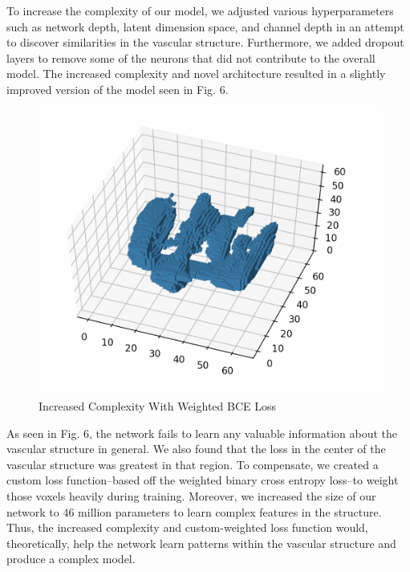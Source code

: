 \documentclass[conference, 10pt]{IEEEtran}
\begin{document}
To increase the complexity of our model, we adjusted various hyperparameters 
such as network depth, latent dimension space, and channel depth in an attempt
to discover similarities in the vascular structure. Furthermore, we added
dropout layers to remove some of the neurons that did not contribute to 
the overall model. The increased complexity and novel architecture resulted in
a slightly improved version of the model seen in Fig. 6. 

\begin{figure}[h]
    \centering
    \includegraphics[scale=0.2]{add_dropout.png}
    \caption{Increased Complexity With Weighted BCE Loss}
\end{figure}

As seen in Fig. 6, the network fails to learn any valuable information about 
the vascular structure in general. We also found that the loss in the center of 
the vascular structure was greatest in that region. To compensate, we created a 
custom loss function--based off the weighted binary cross entropy loss--to 
weight those voxels heavily during training. Moreover, we increased the size of 
our network to 46 million parameters to learn complex features in the 
structure. Thus, the increased complexity and custom-weighted loss function 
would, theoretically, help the network learn patterns within the vascular 
structure and produce a complex model. 
\end{document}
